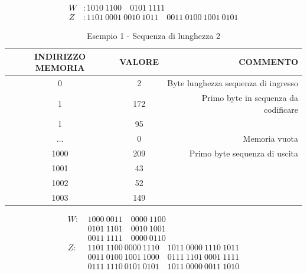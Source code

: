 \documentclass[12pt]{article} %
\begin{document}
			\begin{align*}
				W &: 1010 \ 1100 \quad 0101 \ 1111 \\
				Z &:  1101 \ 0001 \ 0010 \ 1011 \quad 0011 \ 0100 \ 1001 \ 0101
			\end{align*}
			\begin{table}[h!]
				\centering
				\begin{tabular}{ccr}
					\toprule
					INDIRIZZO MEMORIA & VALORE & COMMENTO \\
					\midrule
					0 & 2 & Byte lunghezza sequenza di ingresso \\
					\midrule
					1 & 172 & Primo byte in sequenza da codificare \\
					\midrule
					1 & 95 &  \\
					\midrule
					... &   0 & Memoria vuota \\
					\midrule
					1000 & 209 & Primo byte sequenza di uscita \\
					\midrule
					1001 & 43 & \\
					\midrule
					1002 &  52 & \\
					\midrule
					1003 & 149 & \\			
					\bottomrule
				\end{tabular}
				\caption{Esempio 1 - Sequenza di lunghezza 2}
				\label{tab:1}
			\end{table}
			\newpage
			\begin{align*}
				W : \ &1000 \ 0011 \quad 0000 \ 1100 \\ 
					   &0101 \ 1101 \quad 0010 \ 1001 \\ 
					   &0011 \ 1111 \quad 0000 \ 0110 \\
				Z :  \ &1101 \ 1100 \ 0000 \ 1110  \quad 1011 \ 0000 \ 1110 \ 1011 \\
				     &0011 \ 0100 \ 1001 \ 1000 \quad 0111 \ 1101 \ 0001 \ 1111 \\
				     &0111 \ 1110 \ 0101 \ 0101 \quad  1011 \ 0000 \ 0011 \ 1010 
			\end{align*}
\end{document}
